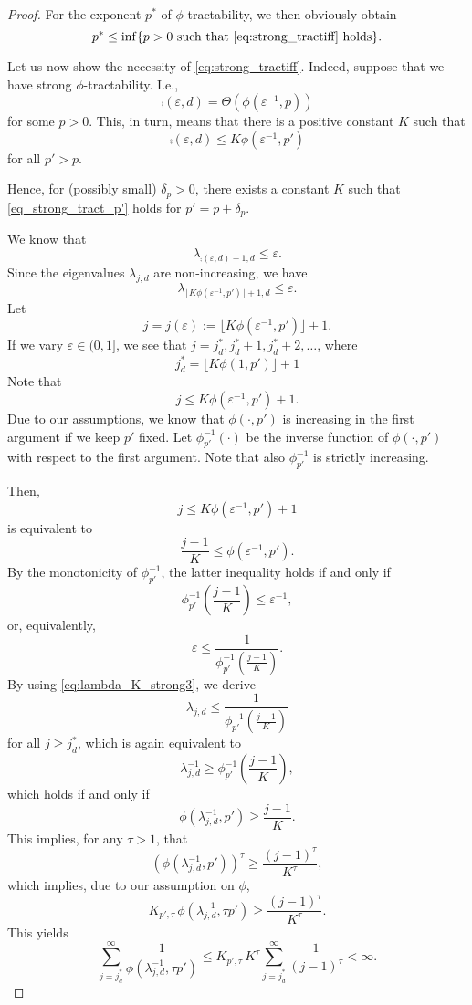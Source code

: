 \documentclass[11pt,a4paper]{article}
\begin{document}
\begin{proof}
\bigskip

For the exponent $p^*$ of $\phi$-tractability, we then obviously obtain 
\[
 p^* \le \inf\{p>0\ \mbox{such that \eqref{eq:strong_tractiff} holds}\}.
\]


\bigskip


Let us now show the necessity of \eqref{eq:strong_tractiff}. Indeed, suppose that we have strong 
$\phi$-tractability. I.e., 
\[
\comp(\varepsilon,d)=\Theta (\phi(\varepsilon^{-1},p))
\]
for some $p>0$. This, in turn, means that there is a positive constant $K$ such that
\begin{equation}\label{eq_strong_tract_p'}
\comp(\varepsilon,d)\le K \phi(\varepsilon^{-1},p')
\end{equation}
for all $p'>p$. 

Hence, for (possibly small) $\delta_p>0$, there exists a constant $K$ such that \eqref{eq_strong_tract_p'} holds for $p'=p+\delta_p$.

We know that
\[
\lambda_{\comp(\varepsilon,d)+1,d}\le \varepsilon.
\]
Since the eigenvalues $\lambda_{j,d}$ are non-increasing, we have
\begin{equation}\label{eq:lambda_K_strong3}
\lambda_{\lfloor K \phi(\varepsilon^{-1},p')\rfloor +1,d}\le \varepsilon.
\end{equation}
Let
\[
j=j (\varepsilon):= \lfloor K \phi(\varepsilon^{-1},p')\rfloor +1.
\]
If we vary $\varepsilon\in (0,1]$, we see that $j=j_d^*, j_d^*+1, j_d^*+2,\ldots$, where 
\[
  j_d^*=\lfloor K \phi(1,p')\rfloor +1
\]
Note that
\[
j\le K \phi(\varepsilon^{-1},p')+1.
\]
Due to our assumptions, we know that 
$\phi(\cdot, p')$ is increasing in the first argument if 
we keep $p'$ fixed. Let $\phi_{p'}^{-1} (\cdot)$ be the inverse function of $\phi (\cdot, p')$ with respect to the first argument. 
Note that also $\phi_{p'}^{-1}$ is strictly increasing. 

Then, 
\[
j \le K \phi(\varepsilon^{-1},p')+1
\]
is equivalent to
\[
\frac{j-1}{K} \le \phi(\varepsilon^{-1},p').
\]
By the monotonicity of $\phi_{p'}^{-1}$, the latter inequality holds if and only if
\[
  \phi_{p'}^{-1} \left(\frac{j-1}{K} \right)
  \le \varepsilon^{-1},
\]
or, equivalently,
\[
 \varepsilon \le \frac{1}{\phi_{p'}^{-1} \left(\frac{j-1}{K} \right)}.
\]
By using \eqref{eq:lambda_K_strong3}, we derive
\[
 \lambda_{j,d}\le \frac{1}{\phi_{p'}^{-1} \left(\frac{j-1}{K} \right)}
\]
for all $j\ge j_d^*$, which is again equivalent to 
\[
\lambda_{j,d}^{-1}\ge \phi_{p'}^{-1} \left(\frac{j-1}{K} \right),
\]
which holds if and only if
\[ 
 \phi (\lambda_{j,d}^{-1}, p') \ge \frac{j-1}{K}.
\]
This implies, for any $\tau>1$, that 
\[ 
 (\phi (\lambda_{j,d}^{-1}, p'))^\tau \ge \frac{(j-1)^\tau}{K^\tau },
\]
which implies, due to our assumption on $\phi$, 
\[ 
 K_{p',\tau}\,\phi (\lambda_{j,d}^{-1}, \tau p') \ge \frac{(j-1)^\tau}{K^\tau }.
\]
This yields
\[
\sum_{j=j_d^*}^\infty \frac{1}{\phi (\lambda_{j,d}^{-1}, \tau p')} \le K_{p',\tau}\, K^\tau \sum_{j=j_d^*}^\infty \frac{1}{(j-1)^\tau}<\infty.
\]


\end{proof}
\end{document}
